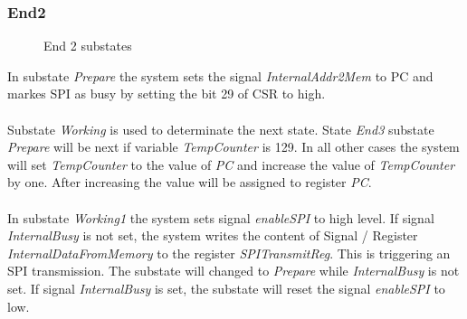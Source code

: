 \subsubsection{End2} 
\begin{figure}[htb] 
\begin{center}
\end{center}
\caption{End 2 substates}
\end{figure}
\noindent
In substate \textit{Prepare} the system sets the signal \textit{InternalAddr2Mem} to PC and markes SPI as busy by setting the bit 29 of CSR to high. \\\\
Substate \textit{Working} is used to determinate the next state. State \textit{End3} substate \textit{Prepare} will be next if variable \textit{TempCounter} is 129. In all other cases the system will set \textit{TempCounter} to the value of \textit{PC} and increase the value of \textit{TempCounter} by one. After increasing the value will be assigned to register \textit{PC}. \\\\
In substate \textit{Working1} the system sets signal \textit{enableSPI} to high level. If signal \textit{InternalBusy} is not set, the system
writes the content of Signal / Register \textit{InternalDataFromMemory} to the register \textit{SPITransmitReg}. This is triggering an SPI transmission. The substate will changed to \textit{Prepare} while \textit{InternalBusy} is not set. If signal \textit{InternalBusy} is set, the substate will reset the signal \textit{enableSPI} to low. 

